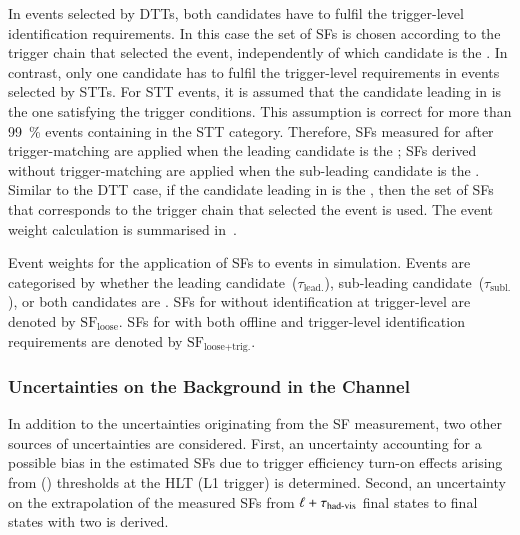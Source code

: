 In events selected by DTTs, both \tauhadvis candidates have to fulfil the
trigger-level identification requirements. In this case the set of SFs is chosen
according to the trigger chain that selected the event, independently of which
\tauhadvis candidate is the \faketauhadvis. In contrast, only one \tauhadvis
candidate has to fulfil the trigger-level requirements in events selected by
STTs. For STT events, it is assumed that the \tauhadvis candidate leading in \pT
is the one satisfying the trigger conditions. This assumption is correct for
more than \SI{99}{\percent} \ttbar events containing \faketauhadvis in the STT
category. Therefore, SFs measured for \faketauhadvis after trigger-matching are
applied when the leading \tauhadvis candidate is the \faketauhadvis; SFs derived
without trigger-matching are applied when the sub-leading \tauhadvis candidate
is the \faketauhadvis. Similar to the DTT case, if the \tauhadvis candidate
leading in \pT is the \faketauhadvis, then the set of SFs that corresponds to
the trigger chain that selected the event is used. The event weight calculation
is summarised in~.

\begin{table}[htbp]
  \centering

  \caption[Event weights for the application of SFs to \ttbarFakes events in
  simulation.]{Event weights for the application of SFs to \ttbarFakes events in
    simulation. Events are categorised by whether the leading \tauhadvis
    candidate~($\tau_{\text{lead.}}$), sub-leading \tauhadvis
    candidate~($\tau_{\text{subl.}}$), or both \tauhadvis candidates are
    \faketauhadvis. SFs for \faketauhadvis without identification at
    trigger-level are denoted by $\text{SF}_{\text{loose}}$. SFs for
    \faketauhadvis with both offline and trigger-level identification
    requirements are denoted by $\text{SF}_\text{loose+trig.}$.}%
  \label{tab:ttbarSF_application_rule}

  \resizebox{\textwidth}{!}{
    
  }
\end{table}


\subsubsection{Uncertainties on the \ttbarFakes Background in the \hadhad
  Channel}

In addition to the uncertainties originating from the SF measurement, two other
sources of uncertainties are considered. First, an uncertainty accounting for a
possible bias in the estimated SFs due to trigger efficiency turn-on effects
arising from \tauhadvis \pT (\ET) thresholds at the HLT (L1 trigger) is
determined. Second, an uncertainty on the extrapolation of the measured SFs from
$\ell + \tau_{\text{had-vis}}$ final states to final states with two \tauhadvis is derived.

